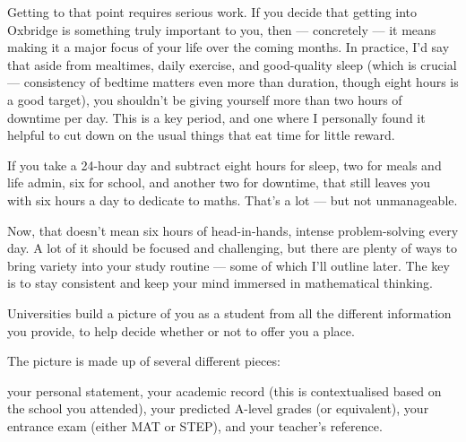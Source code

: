 \documentclass[11pt]{article}
\newif\ifshowcomments
\newif\ifshowpersonal
\newcommand{\comment}[1]{\ifshowcomments\textcolor{myblue}{\textbf{#1}}\fi}
\newcommand{\personal}[1]{\ifshowpersonal\textcolor{myorange}{\emph{#1}}\fi}
\begin{document}
Getting to that point requires serious work. If you decide that getting into Oxbridge is something truly important to you, then — concretely — it means making it a major focus of your life over the coming months. In practice, I’d say that aside from mealtimes, daily exercise, and good-quality sleep (which is crucial — consistency of bedtime matters even more than duration, though eight hours is a good target), you shouldn’t be giving yourself more than two hours of downtime per day. This is a key period, and one where I personally found it helpful to cut down on the usual things that eat time for little reward.

If you take a 24-hour day and subtract eight hours for sleep, two for meals and life admin, six for school, and another two for downtime, that still leaves you with six hours a day to dedicate to maths. That’s a lot — but not unmanageable.

Now, that doesn’t mean six hours of head-in-hands, intense problem-solving every day. A lot of it should be focused and challenging, but there are plenty of ways to bring variety into your study routine — some of which I’ll outline later. The key is to stay consistent and keep your mind immersed in mathematical thinking.

\personal{For me, this meant cutting out things like watching TV shows. That was the approach I chose. I'm not claiming it’s what’s needed to get into Oxford — I almost certainly could have done less and still made it — but it proved very useful during my time at Oxford, and I enjoyed it.}

\comment{That said, if the idea of that routine fills you with dread — and you can’t imagine sustaining it even for a month — then I’d take a moment to think about how much you’d actually enjoy Oxford. You don’t have to love the idea of that much maths every day, and the workload at university may well be less structured or even less intense at times. But it’s worth asking: do you enjoy the subject enough to want to live and breathe it for a while? If the answer is yes, you’ll probably be just fine.}

Universities build a picture of you as a student from all the different information you provide, to help decide whether or not to offer you a place.

The picture is made up of several different pieces:

    your personal statement,
    your academic record (this is contextualised based on the school you attended),
    your predicted A-level grades (or equivalent),
    your entrance exam (either MAT or STEP),
    and your teacher's reference.
\end{document}
